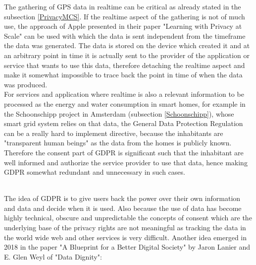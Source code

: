 \documentclass[a4paper,12pt]{report}
\begin{document}
		The gathering of GPS data in realtime can be critical as already stated in the subsection \ref{PrivacyMCS}. If the realtime aspect of the gathering is not of much use, the approach of Apple presented in their paper "Learning with Privacy at Scale" \cite{PrivacyApple} can be used with which the data is sent independent from the timeframe the data was generated. The data is stored on the device which created it and at an arbitrary point in time it is actually sent to the provider of the application or service that wants to use this data, therefore detaching the realtime aspect and make it somewhat impossible to trace back the point in time of when the data was produced. \\
		For services and application where realtime is also a relevant information to be processed as the energy and water consumption in smart homes, for example in the Schoonschipp project in Amsterdam (subsection \ref{Schoonschipp}), whose smart grid system relies on that data, the General Data Protection Regulation can be a really hard to implement directive, because the inhabitants are "transparent human beings" as the data from the homes is publicly known. Therefore the consent part of GDPR is significant such that the inhabitant are well informed and authorize the service provider to use that data, hence making GDPR somewhat redundant and unnecessary in such cases.
	\closesection
	
	\hfill \\
	\noindent The idea of GDPR is to give users back the power over their own information and data and decide when it is used. Also because the use of data has become highly technical, obscure and unpredictable the concepts of consent which are the underlying base of the privacy rights are not meaningful as tracking the data in the world wide web and other services is very difficult. Another idea emerged in 2018 in the paper "A Blueprint for a Better Digital Society" by Jaron Lanier and E. Glen Weyl of "Data Dignity":
	
\end{document}
